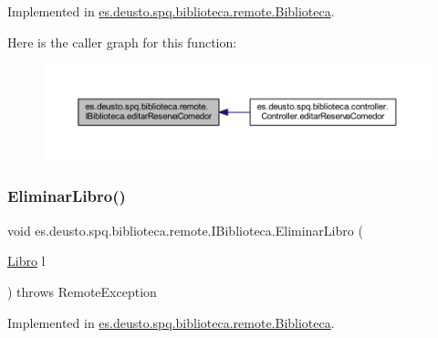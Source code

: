 Implemented in \mbox{\hyperlink{classes_1_1deusto_1_1spq_1_1biblioteca_1_1remote_1_1_biblioteca_a51fa3f46456f63c8e2e903359ab0a482}{es.\+deusto.\+spq.\+biblioteca.\+remote.\+Biblioteca}}.

Here is the caller graph for this function\+:
\nopagebreak
\begin{figure}[H]
\begin{center}
\leavevmode
\includegraphics[width=350pt]{interfacees_1_1deusto_1_1spq_1_1biblioteca_1_1remote_1_1_i_biblioteca_ac492277af5ed00def28276cd8b0a5394_icgraph}
\end{center}
\end{figure}
\mbox{\label{interfacees_1_1deusto_1_1spq_1_1biblioteca_1_1remote_1_1_i_biblioteca_addbe4ccd7324f0302e25447f2be3403a}} 
\subsubsection{\texorpdfstring{Eliminar\+Libro()}{EliminarLibro()}}
{\footnotesize\ttfamily void es.\+deusto.\+spq.\+biblioteca.\+remote.\+I\+Biblioteca.\+Eliminar\+Libro (\begin{DoxyParamCaption}\item[{\mbox{\hyperlink{classes_1_1deusto_1_1spq_1_1biblioteca_1_1data_1_1_libro}{Libro}}}]{l }\end{DoxyParamCaption}) throws Remote\+Exception}



Implemented in \mbox{\hyperlink{classes_1_1deusto_1_1spq_1_1biblioteca_1_1remote_1_1_biblioteca_aec13dff9f9d789b103b51d243e52832e}{es.\+deusto.\+spq.\+biblioteca.\+remote.\+Biblioteca}}.

